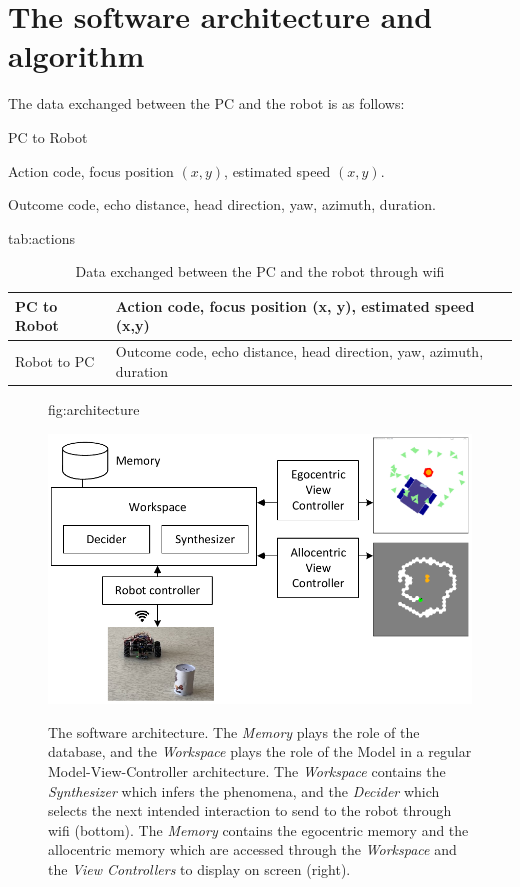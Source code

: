 \documentclass[pmlr]{jmlr}%
\begin{document}
\section{The software architecture and algorithm}
\label{sec:software}

The data exchanged between the PC and the robot is as follows: 

\begin{altdescription}{PC to Robot}
	\item[PC to Robot] Action code, focus position $(x, y)$, estimated speed $(x,y)$.
	\item[Robot to PC] Outcome code, echo distance, head direction, yaw, azimuth, duration.
\end{altdescription}


\begin{table}[htbp]
	\floatconts
	{tab:actions}%
	{\caption{Data exchanged between the PC and the robot through wifi}}%
	{\begin{tabular}{l|l}
			\toprule
			PC to Robot & Action code, focus position (x, y), estimated speed (x,y)\\
			\midrule
			Robot to PC & Outcome code, echo distance, head direction, yaw, azimuth, duration\\
			\bottomrule
	\end{tabular}}
\end{table}


\begin{figure}[htbp]
	\floatconts
	{fig:architecture}
	{\caption{The software architecture. 
			The \textit{Memory} plays the role of the database, and the \textit{Workspace} plays the role of the Model in a regular Model-View-Controller architecture. 
			The \textit{Workspace} contains the \textit{Synthesizer} which infers the phenomena, and 
			the \textit{Decider} which selects the next intended interaction to send to the robot through wifi (bottom). 
			The \textit{Memory} contains the egocentric memory and the allocentric memory which are accessed through the \textit{Workspace} and the \textit{View Controllers} to display on screen (right).}}
	{\includegraphics[width=0.8\linewidth]{images/Figure_2_Architecture}}
\end{figure}
\end{document}
